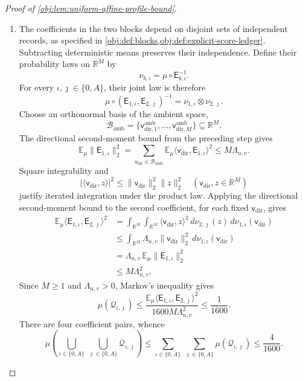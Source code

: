 \begin{proof}[Proof of \cref{obj:lem:uniform-affine-profile-bound}]
\begin{enumerate}
\item
The coefficients in the two blocks depend on disjoint sets of independent records, as specified in \cref{obj:def:blocks,obj:def:explicit-score-ledger}. Subtracting deterministic means preserves their independence. Define their probability laws on \(\mathbb R^M\) by
\[
\nu_{b,\iota}
=
\mu\circ\mathsf E_{b,\iota}^{-1}.
\]
For every \(\iota,\jmath\in\{0,A\}\), their joint law is therefore
\[
\mu\circ
(\mathsf E_{1,\iota},\mathsf E_{2,\jmath})^{-1}
=
\nu_{1,\iota}\otimes\nu_{2,\jmath}.
\]
Choose an orthonormal basis of the ambient space,
\[
\mathcal B_{\mathrm{amb}}
=
\{\mathsf v^{\mathrm{amb}}_{\mathrm{dir},1},\ldots,\mathsf v^{\mathrm{amb}}_{\mathrm{dir},M}\}
\subseteq\mathbb R^M.
\]
The directional second-moment bound from the preceding step gives
\[
\mathbb E_\mu\|\mathsf E_{1,\iota}\|_2^2
=
\sum_{\mathsf v_{\mathrm{dir}}\in\mathcal B_{\mathrm{amb}}}
\mathbb E_\mu\langle \mathsf v_{\mathrm{dir}},\mathsf E_{1,\iota}\rangle^2
\le M\Lambda_{n,v}.
\]
Square integrability and
\[
|\langle \mathsf v_{\mathrm{dir}},z\rangle|^2\le\|\mathsf v_{\mathrm{dir}}\|_2^2\|z\|_2^2
\quad(\mathsf v_{\mathrm{dir}},z\in\mathbb R^M)
\]
justify iterated integration under the product law. Applying the directional second-moment bound to the second coefficient, for each fixed \(\mathsf v_{\mathrm{dir}}\), gives
\[
\begin{aligned}
\mathbb E_\mu
\langle\mathsf E_{1,\iota},\mathsf E_{2,\jmath}\rangle^2
&=
\int_{\mathbb R^M}\int_{\mathbb R^M}
\langle \mathsf v_{\mathrm{dir}},z\rangle^2\,
d\nu_{2,\jmath}(z)\,d\nu_{1,\iota}(\mathsf v_{\mathrm{dir}})\\
&\le
\int_{\mathbb R^M}
\Lambda_{n,v}\|\mathsf v_{\mathrm{dir}}\|_2^2\,d\nu_{1,\iota}(\mathsf v_{\mathrm{dir}})\\
&=
\Lambda_{n,v}\,
\mathbb E_\mu\|\mathsf E_{1,\iota}\|_2^2\\
&\le M\Lambda_{n,v}^2.
\end{aligned}
\]
Since \(M\ge1\) and \(\Lambda_{n,v}>0\), Markov's inequality gives
\[
\mu(\mathcal Q_{\iota,\jmath})
\le
\frac{
\mathbb E_\mu
\langle\mathsf E_{1,\iota},\mathsf E_{2,\jmath}\rangle^2
}{
1600M\Lambda_{n,v}^2
}
\le\frac1{1600}.
\]
There are four coefficient pairs, whence
\[
\mu\left(
\bigcup_{\iota\in\{0,A\}}\ \bigcup_{\jmath\in\{0,A\}}
\mathcal Q_{\iota,\jmath}
\right)
\le
\sum_{\iota\in\{0,A\}}\ \sum_{\jmath\in\{0,A\}}
\mu(\mathcal Q_{\iota,\jmath})
\le\frac4{1600}.
\]


\end{enumerate}
\end{proof}
